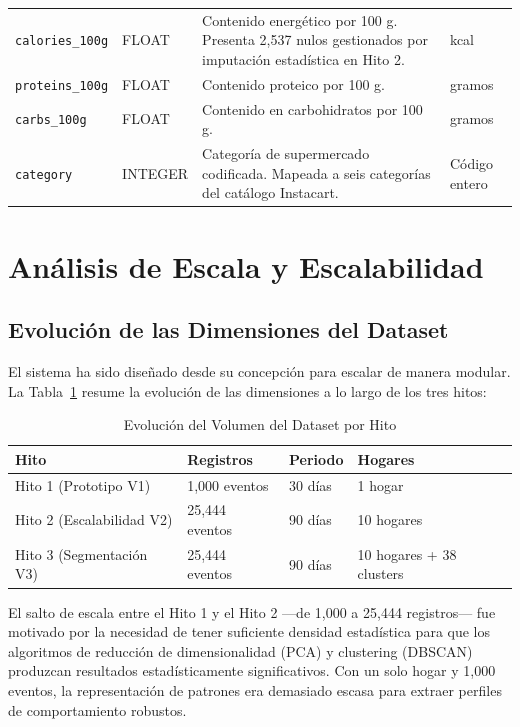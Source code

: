 \documentclass[12pt,a4paper]{article}
\newcommand{\code}[1]{\texttt{\small #1}}
\begin{document}
\begin{longtable}{@{}p{3.2cm}p{1.7cm}p{5.5cm}p{3cm}@{}}
\code{calories\_100g}& FLOAT    & Contenido energético por 100 g. Presenta 2{,}537 nulos gestionados por imputación estadística en Hito 2. & kcal \\[4pt]
\code{proteins\_100g}& FLOAT    & Contenido proteico por 100 g. & gramos \\[4pt]
\code{carbs\_100g}   & FLOAT    & Contenido en carbohidratos por 100 g. & gramos \\[4pt]
\code{category}      & INTEGER  & Categoría de supermercado codificada. Mapeada a seis categorías del catálogo Instacart. & Código entero \\
\bottomrule
\end{longtable}

\section{Análisis de Escala y Escalabilidad}

\subsection{Evolución de las Dimensiones del Dataset}

El sistema ha sido diseñado desde su concepción para escalar de manera modular. La Tabla~\ref{tab:escalabilidad} resume la evolución de las dimensiones a lo largo de los tres hitos:

\begin{table}[H]
\centering
\caption{Evolución del Volumen del Dataset por Hito}
\label{tab:escalabilidad}
\begin{tabular}{@{}llll@{}}
\toprule
\textbf{Hito} & \textbf{Registros} & \textbf{Periodo} & \textbf{Hogares} \\
\midrule
Hito 1 (Prototipo V1) & 1{,}000 eventos   & 30 días   & 1 hogar \\
Hito 2 (Escalabilidad V2) & 25{,}444 eventos & 90 días   & 10 hogares \\
Hito 3 (Segmentación V3) & 25{,}444 eventos & 90 días   & 10 hogares + 38 clusters \\
\bottomrule
\end{tabular}
\end{table}

El salto de escala entre el Hito 1 y el Hito 2 —de 1{,}000 a 25{,}444 registros— fue motivado por la necesidad de tener suficiente densidad estadística para que los algoritmos de reducción de dimensionalidad (PCA) y clustering (DBSCAN) produzcan resultados estadísticamente significativos. Con un solo hogar y 1{,}000 eventos, la representación de patrones era demasiado escasa para extraer perfiles de comportamiento robustos.
\end{document}
